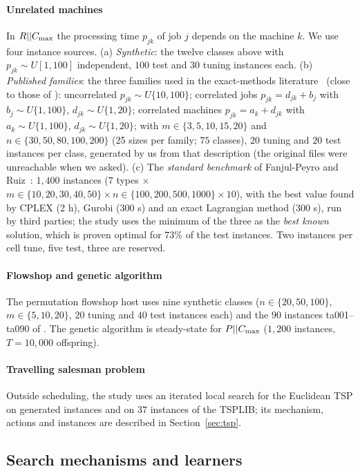 \paragraph{Unrelated machines} In $R||C_{\max}$ the processing time $p_{jk}$ of job $j$ depends on the machine $k$. We use four instance sources. (a) \emph{Synthetic}: the twelve classes above with $p_{jk}\sim U[1,100]$ independent, $100$ test and $30$ tuning instances each. (b) \emph{Published families}: the three families used in the exact-methods literature~\citep{AbladEtAl2021} (close to those of \citet{FanjulPeyroRuiz2010}): uncorrelated $p_{jk}\sim U\{10,100\}$; correlated jobs $p_{jk}=d_{jk}+b_j$ with $b_j\sim U\{1,100\}$, $d_{jk}\sim U\{1,20\}$; correlated machines $p_{jk}=a_k+d_{jk}$ with $a_k\sim U\{1,100\}$, $d_{jk}\sim U\{1,20\}$; with $m\in\{3,5,10,15,20\}$ and $n\in\{30,50,80,100,200\}$ (25 sizes per family; $75$ classes), $20$ tuning and $20$ test instances per class, generated by us from that description (the original files were unreachable when we asked). (c) The \emph{standard benchmark} of Fanjul-Peyro and Ruiz~\citep{FanjulPeyroRuiz2010}: $1{,}400$ instances ($7$ types $\times$ $m\in\{10,20,30,40,50\}\times n\in\{100,200,500,1000\}\times10$), with the best value found by CPLEX (2 h), Gurobi (300 s) and an exact Lagrangian method (300 s), run by third parties; the study uses the minimum of the three as the \emph{best known} solution, which is proven optimal for $73\%$ of the test instances. Two instances per cell tune, five test, three are reserved.

\paragraph{Flowshop and genetic algorithm} The permutation flowshop host uses nine synthetic classes ($n\in\{20,50,100\}$, $m\in\{5,10,20\}$, $20$ tuning and $40$ test instances each) and the $90$ instances ta001--ta090 of \citet{Taillard1993}. The genetic algorithm is steady-state for $P||C_{\max}$ ($1{,}200$ instances, $T=10{,}000$ offspring).

\paragraph{Travelling salesman problem} Outside scheduling, the study uses an iterated local search for the Euclidean TSP on generated instances and on $37$ instances of the TSPLIB; its mechanism, actions and instances are described in Section~\ref{sec:tsp}.

\subsection{Search mechanisms and learners}
\label{sec:learners}
